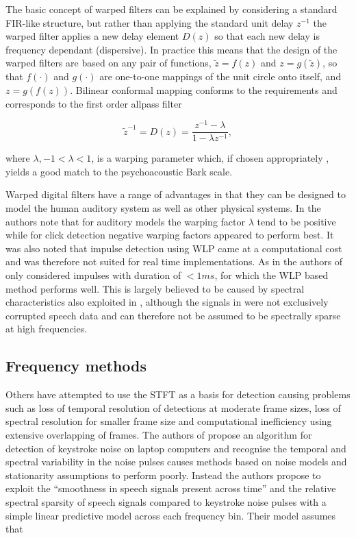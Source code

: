 The basic concept of warped filters can be explained by considering a standard FIR-like structure, but rather than applying the standard unit delay $z^{-1}$ the warped filter applies a new delay element $D(z)$ so that each new delay is frequency dependant (dispersive). In practice this means that the design of the warped filters are based on any pair of functions, $\tilde{z} = f(z)$ and $z = g(\tilde{z})$, so that $f(\cdot)$ and $g(\cdot)$ are one-to-one mappings of the unit circle onto itself, and $z = g\left( f(z) \right)$\cite{Karjalainen1997}. Bilinear conformal mapping\cite{Brown1996} conforms to the requirements and corresponds to the first order allpass filter

\begin{equation}\label{eq:Karjalainen1997}
\tilde{z}^{-1} = D(z) = \frac{z^{-1} - \lambda}{1 - \lambda z^{-1}},
\end{equation}

where $\lambda, -1 < \lambda < 1$, is a warping parameter which, if chosen appropriately \cite{Karjalainen1997}, yields a good match to the psychoacoustic Bark scale\cite{Smith1995}.

Warped digital filters have a range of advantages in that they can be designed to model the human auditory system as well as other physical systems\cite{Karjalainen1997}. In \cite{Esquef2002} the authors note that for auditory models the warping factor $\lambda$ tend to be positive while for click detection negative warping factors appeared to perform best. It was also noted that impulse detection using WLP came at a computational cost and was therefore not suited for real time implementations. As in \cite{Godsill1998book} the authors of \cite{Esquef2002} only considered impulses with duration of $<1 ms$, for which the WLP based method performs well. This is largely believed to be caused by spectral characteristics also exploited in \cite{Kasparis1993}\cite{US6795559}, although the signals in \cite{Esquef2002} were not exclusively corrupted speech data and can therefore not be assumed to be spectrally sparse at high frequencies.

\subsection{Frequency methods}
Others have attempted to use the STFT as a basis for detection \cite{Czyzewski1995}\cite{Subramanya2007}\cite{Sugiyama2007} causing problems such as loss of temporal resolution of detections at moderate frame sizes, loss of spectral resolution for smaller frame size and computational inefficiency using extensive overlapping of frames. The authors of \cite{Subramanya2007} propose an algorithm for detection of keystroke noise on laptop computers and recognise the temporal and spectral variability in the noise pulses causes methods based on noise models and stationarity assumptions to perform poorly. Instead the authors propose to exploit the ``smoothness in speech signals present across time'' and the relative spectral sparsity of speech signals compared to keystroke noise pulses with a simple linear predictive model across each frequency bin. Their model assumes that

